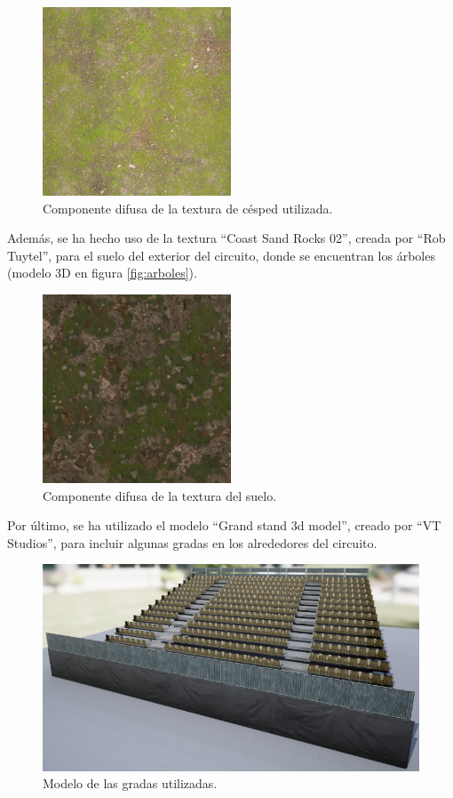 \begin{figure}[H]
    \centering
    \includegraphics[width=0.5\textwidth]{imagenes/Ground037_1K_Color.png}
    \caption{Componente difusa de la textura de césped utilizada.}
    \label{fig:grasstexture}
\end{figure}

Además, se ha hecho uso de la textura ``Coast Sand Rocks 02''\cite{coastsand}, creada por ``Rob Tuytel'', para el suelo del exterior del circuito, donde se encuentran los árboles (modelo 3D en figura \ref{fig:arboles}).

\begin{figure}[H]
    \centering
    \includegraphics[width=0.5\textwidth]{imagenes/coast_sand_rocks_02_diff_4k.png}
    \caption{Componente difusa de la textura del suelo.}
    \label{fig:coastsand}
\end{figure}

Por último, se ha utilizado el modelo ``Grand stand 3d model''\cite{grandstand}, creado por ``VT Studios'', para incluir algunas gradas en los alrededores del circuito.

\begin{figure}[H]
    \centering
    \includegraphics[width=\textwidth]{imagenes/grandstand.png}
    \caption{Modelo de las gradas utilizadas.}
    \label{fig:grandstand}
\end{figure}